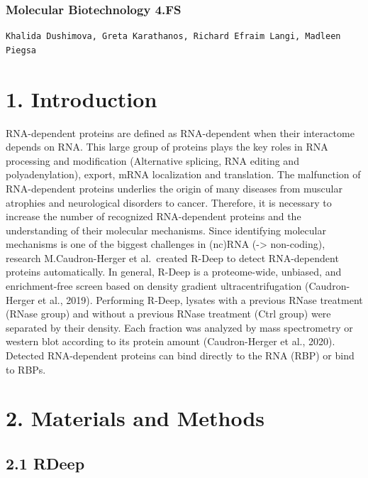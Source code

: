 \documentclass[
]{article}
\begin{document}
\hypertarget{molecular-biotechnology-4.fs}{%
\subsubsection{\texorpdfstring{\textbf{Molecular Biotechnology
4.FS}}{Molecular Biotechnology 4.FS}}\label{molecular-biotechnology-4.fs}}

\begin{verbatim}
Khalida Dushimova, Greta Karathanos, Richard Efraim Langi, Madleen Piegsa
\end{verbatim}

\hypertarget{introduction}{%
\section{1. Introduction}\label{introduction}}

RNA-dependent proteins are defined as RNA-dependent when their
interactome depends on RNA. This large group of proteins plays the key
roles in RNA processing and modification (Alternative splicing, RNA
editing and polyadenylation), export, mRNA localization and translation.
The malfunction of RNA-dependent proteins underlies the origin of many
diseases from muscular atrophies and neurological disorders to cancer.
Therefore, it is necessary to increase the number of recognized
RNA-dependent proteins and the understanding of their molecular
mechanisms. Since identifying molecular mechanisms is one of the biggest
challenges in (nc)RNA (-\textgreater{} non-coding), research
M.Caudron-Herger et al.~created R-Deep to detect RNA-dependent proteins
automatically. In general, R-Deep is a proteome-wide, unbiased, and
enrichment-free screen based on density gradient ultracentrifugation
(Caudron-Herger et al., 2019). Performing R-Deep, lysates with a
previous RNase treatment (RNase group) and without a previous RNase
treatment (Ctrl group) were separated by their density. Each fraction
was analyzed by mass spectrometry or western blot according to its
protein amount (Caudron-Herger et al., 2020). Detected RNA-dependent
proteins can bind directly to the RNA (RBP) or bind to RBPs.

\hypertarget{materials-and-methods}{%
\section{2. Materials and Methods}\label{materials-and-methods}}

\hypertarget{rdeep}{%
\subsection{2.1 RDeep}\label{rdeep}}
\end{document}
